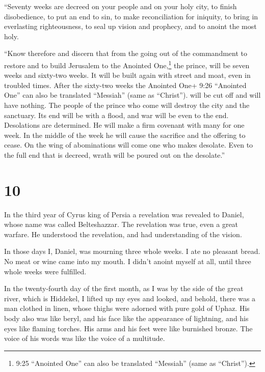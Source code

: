  ``Seventy weeks are decreed on your people and on your
holy city, to finish disobedience, to put an end to sin, to make
reconciliation for iniquity, to bring in everlasting righteousness, to
seal up vision and prophecy, and to anoint the most holy.

 ``Know therefore and discern that from the going out of
the commandment to restore and to build Jerusalem to the Anointed
One,\footnote{9:25 ``Anointed One'' can also be translated ``Messiah''
  (same as ``Christ'').} the prince, will be seven weeks and sixty-two
weeks. It will be built again with street and moat, even in troubled
times.  After the sixty-two weeks the Anointed One+ 9:26
``Anointed One'' can also be translated ``Messiah'' (same as
``Christ''). will be cut off and will have nothing. The people of the
prince who come will destroy the city and the sanctuary. Its end will be
with a flood, and war will be even to the end. Desolations are
determined.  He will make a firm covenant with many for one
week. In the middle of the week he will cause the sacrifice and the
offering to cease. On the wing of abominations will come one who makes
desolate. Even to the full end that is decreed, wrath will be poured out
on the desolate.''

\hypertarget{section-9}{%
\section{10}\label{section-9}}

 In the third year of Cyrus king of Persia a revelation was
revealed to Daniel, whose name was called Belteshazzar. The revelation
was true, even a great warfare. He understood the revelation, and had
understanding of the vision.

 In those days I, Daniel, was mourning three whole weeks.
 I ate no pleasant bread. No meat or wine came into my
mouth. I didn't anoint myself at all, until three whole weeks were
fulfilled.

 In the twenty-fourth day of the first month, as I was by
the side of the great river, which is Hiddekel,  I lifted up
my eyes and looked, and behold, there was a man clothed in linen, whose
thighs were adorned with pure gold of Uphaz.  His body also
was like beryl, and his face like the appearance of lightning, and his
eyes like flaming torches. His arms and his feet were like burnished
bronze. The voice of his words was like the voice of a multitude.

